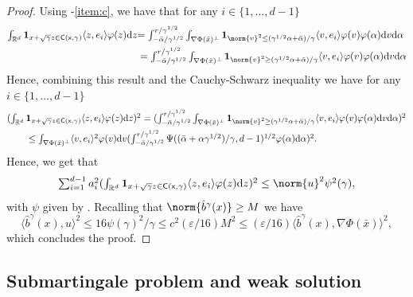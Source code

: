 \begin{proof}
	Using -\ref{item:c}, we have that for any $i \in \{1, \dots, d-1\}$ \begin{align} \textstyle{ \int_{\R^d} \bm{1}_{x + \sqrt{\gamma}z \in \sf{C}(x,\gamma)} \langle z, e_i \rangle \varphi(z) \mathrm{d} z}&\textstyle{= \int_{-\bar{\alpha}/\gamma^{1/2}}^{r/\gamma^{1/2}} \int_{\nabla \Phi(\bar{x})^\perp} \bm{1}_{\norm{v}^2 \leq (\gamma^{1/2} \alpha + \bar{\alpha})/\gamma} \langle v, e_i \rangle \varphi(v) \varphi(\alpha) \mathrm{d} v \mathrm{d} \alpha} \\ &= \textstyle{\int_{-\bar{\alpha}/\gamma^{1/2}}^{r/\gamma^{1/2}} \int_{\nabla \Phi(\bar{x})^\perp} \bm{1}_{\norm{v}^2 \geq (\gamma^{1/2} \alpha + \bar{\alpha})/\gamma} \langle v, e_i \rangle \varphi(v) \varphi(\alpha) \mathrm{d} v \mathrm{d} \alpha}\end{align} Hence, combining this result and the Cauchy-Schwarz inequality we have for any $i \in \{1, \dots, d-1\}$ \begin{align}  & \textstyle (\int_{\R^d} \bm{1}_{x + \sqrt{\gamma}z \in \sf{C}(x,\gamma)} \langle z, e_i \rangle \varphi(z) \mathrm{d} z)^2 = \textstyle (\int_{-\bar{\alpha}/\gamma^{1/2}}^{r/\gamma^{1/2}} \int_{\nabla \Phi(\bar{x})^\perp} \bm{1}_{\norm{v}^2 \geq (\gamma^{1/2} \alpha + \bar{\alpha})/\gamma} \langle v, e_i \rangle \varphi(v) \varphi(\alpha) \mathrm{d} v \mathrm{d} \alpha)^2 \\ & \qquad \leq \textstyle \int_{\nabla \Phi(\bar{x})^\perp} \langle v, e_i \rangle^2 \varphi(v) \mathrm{d} v (\int_{-\bar{\alpha}/\gamma^{1/2}}^{r/\gamma^{1/2}} \Psi((\bar{\alpha} + \alpha\gamma^{1/2})/\gamma, d-1)^{1/2} \varphi(\alpha) \mathrm{d} \alpha )^2 .
	\end{align}
	Hence, we get that \begin{equation} \textstyle{\sum_{i=1}^{d-1}a_i^2 ( \int_{\R^d} \bm{1}_{x + \sqrt{\gamma}z \in \sf{C}(x,\gamma)} \langle z, e_i \rangle \varphi(z) \mathrm{d} z)^2} \leq \norm{u}^2 \psi^2(\gamma) , \end{equation} with $\psi$ given by .
	Recalling that $\norm{\hat{b}^\gamma(x)} \geq M$ we have \begin{equation} \langle \hat{b}^\gamma(x), u \rangle^2 \leq 16\psi(\gamma)^2/\gamma \leq c^2 (\varepsilon / 16) M^2 \leq (\varepsilon / 16) \langle \hat{b}^\gamma(x), \nabla \Phi(\bar{x}) \rangle^2 , \end{equation} which concludes the proof.
\end{proof}

\subsection{Submartingale problem and weak solution}
\label{sec:submartingale}


